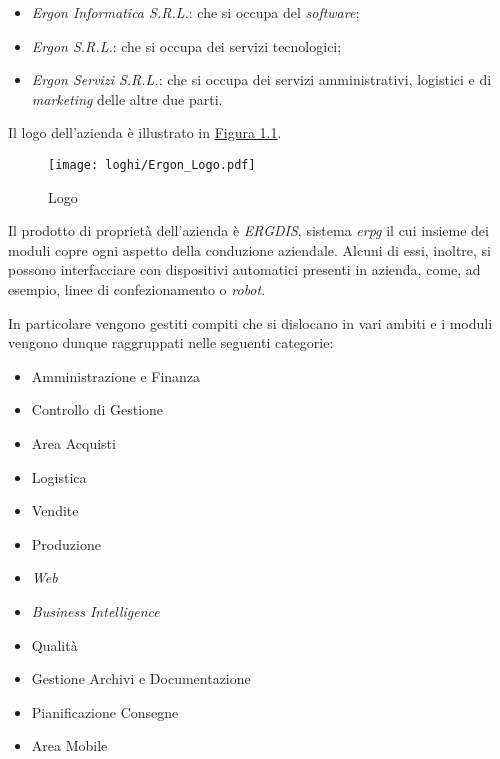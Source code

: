 \begin{itemize}
    \item \textit{Ergon Informatica S.R.L.}: che si occupa del \textit{software};
    \item \textit{Ergon S.R.L.}: che si occupa dei servizi tecnologici;
    \item \textit{Ergon Servizi S.R.L.}: che si occupa dei servizi amministrativi, logistici e di \textit{marketing} delle altre due parti.
\end{itemize}
Il logo dell'azienda è illustrato in \hyperref[fig:logo]{Figura 1.1}.
\vfill
\begin{figure}[!h]
    \centering
    \texttt{[image: loghi/Ergon\_Logo.pdf]}
    \caption{Logo \myCompany}
    \label{fig:logo}
\end{figure}
\vfill
\noindent Il prodotto di proprietà dell'azienda è \textit{ERGDIS}, sistema \textit{\gls{erpg}}
il cui insieme dei moduli copre ogni aspetto della conduzione aziendale.
Alcuni di essi, inoltre, si possono interfacciare con dispositivi automatici presenti in azienda, come, ad esempio,
linee di confezionamento o \textit{robot}.

\newpage
\noindent In particolare  vengono gestiti compiti che si dislocano in vari ambiti e
i moduli vengono dunque raggruppati nelle seguenti categorie:
\begin{multicols}{2}
\begin{itemize}
    \item Amministrazione e Finanza
    \item Controllo di Gestione
    \item Area Acquisti
    \item Logistica
    \item Vendite
    \item Produzione
\end{itemize}
\begin{itemize}
    \item \textit{Web}
    \item \textit{Business Intelligence}
    \item Qualità
    \item Gestione Archivi e Documentazione
    \item Pianificazione Consegne
    \item Area Mobile
\end{itemize}
\end{multicols}

